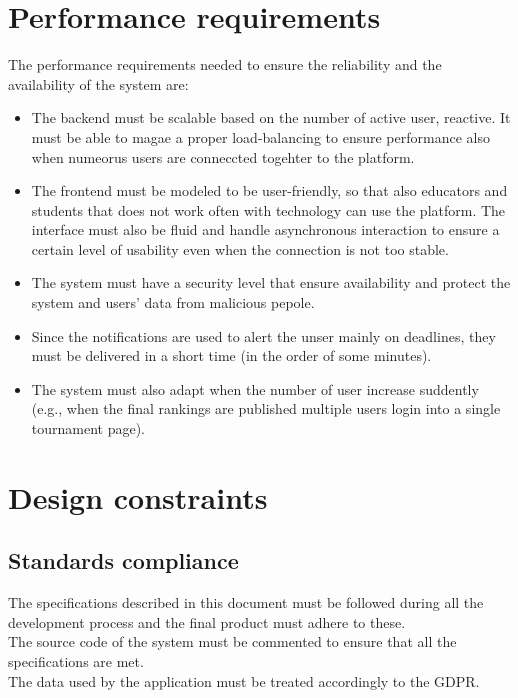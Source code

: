 \documentclass[12pt, a4paper]{report}
\begin{document}
    \section{Performance requirements}
        The performance requirements needed to ensure the reliability and the availability of the system are: 
        \begin{itemize}
            \item The backend must be scalable based on the number of active user, reactive. 
                It must be able to magae a proper load-balancing to ensure performance also when numeorus users are conneccted togehter to the platform. 
            \item The frontend must be modeled to be user-friendly, so that also educators and students that does not work often with technology can use the platform. 
                The interface must also be fluid and handle asynchronous interaction to ensure a certain level of usability even when the connection is not too stable. 
            \item The system must have a security level that ensure availability and protect the system and users' data from malicious pepole. 
            \item Since the notifications are used to alert the unser mainly on deadlines, they must be delivered in a short time (in the order of some minutes). 
            \item The system must also adapt when the number of user increase suddently (e.g., when the final rankings are published multiple users login into a single tournament page). 
        \end{itemize}

    \section{Design constraints}
        \subsection{Standards compliance}
        The specifications described in this document must be followed during all the development process and the final product must adhere to these. \\
        The source code of the system must be commented to ensure that all the specifications are met. \\
        The data used by the application must be treated accordingly to the GDPR. 
\end{document}
